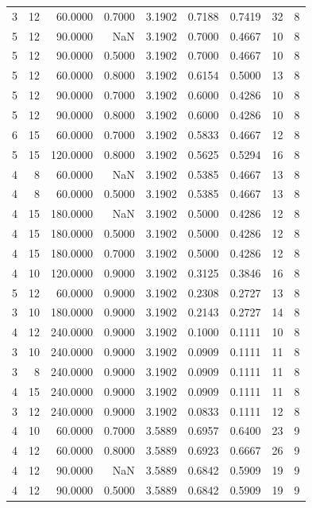 \begin{tabular}{rrrrrrrrr}
3 & 12 & 60.0000 & 0.7000 & 3.1902 & 0.7188 & 0.7419 & 32 & 8 \\
5 & 12 & 90.0000 & NaN & 3.1902 & 0.7000 & 0.4667 & 10 & 8 \\
5 & 12 & 90.0000 & 0.5000 & 3.1902 & 0.7000 & 0.4667 & 10 & 8 \\
5 & 12 & 60.0000 & 0.8000 & 3.1902 & 0.6154 & 0.5000 & 13 & 8 \\
5 & 12 & 90.0000 & 0.7000 & 3.1902 & 0.6000 & 0.4286 & 10 & 8 \\
5 & 12 & 90.0000 & 0.8000 & 3.1902 & 0.6000 & 0.4286 & 10 & 8 \\
6 & 15 & 60.0000 & 0.7000 & 3.1902 & 0.5833 & 0.4667 & 12 & 8 \\
5 & 15 & 120.0000 & 0.8000 & 3.1902 & 0.5625 & 0.5294 & 16 & 8 \\
4 & 8 & 60.0000 & NaN & 3.1902 & 0.5385 & 0.4667 & 13 & 8 \\
4 & 8 & 60.0000 & 0.5000 & 3.1902 & 0.5385 & 0.4667 & 13 & 8 \\
4 & 15 & 180.0000 & NaN & 3.1902 & 0.5000 & 0.4286 & 12 & 8 \\
4 & 15 & 180.0000 & 0.5000 & 3.1902 & 0.5000 & 0.4286 & 12 & 8 \\
4 & 15 & 180.0000 & 0.7000 & 3.1902 & 0.5000 & 0.4286 & 12 & 8 \\
4 & 10 & 120.0000 & 0.9000 & 3.1902 & 0.3125 & 0.3846 & 16 & 8 \\
5 & 12 & 60.0000 & 0.9000 & 3.1902 & 0.2308 & 0.2727 & 13 & 8 \\
3 & 10 & 180.0000 & 0.9000 & 3.1902 & 0.2143 & 0.2727 & 14 & 8 \\
4 & 12 & 240.0000 & 0.9000 & 3.1902 & 0.1000 & 0.1111 & 10 & 8 \\
3 & 10 & 240.0000 & 0.9000 & 3.1902 & 0.0909 & 0.1111 & 11 & 8 \\
3 & 8 & 240.0000 & 0.9000 & 3.1902 & 0.0909 & 0.1111 & 11 & 8 \\
4 & 15 & 240.0000 & 0.9000 & 3.1902 & 0.0909 & 0.1111 & 11 & 8 \\
3 & 12 & 240.0000 & 0.9000 & 3.1902 & 0.0833 & 0.1111 & 12 & 8 \\
4 & 10 & 60.0000 & 0.7000 & 3.5889 & 0.6957 & 0.6400 & 23 & 9 \\
4 & 12 & 60.0000 & 0.8000 & 3.5889 & 0.6923 & 0.6667 & 26 & 9 \\
4 & 12 & 90.0000 & NaN & 3.5889 & 0.6842 & 0.5909 & 19 & 9 \\
4 & 12 & 90.0000 & 0.5000 & 3.5889 & 0.6842 & 0.5909 & 19 & 9 \\

\end{tabular}
